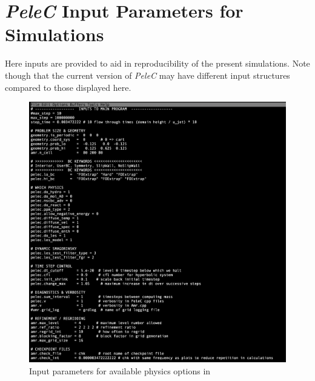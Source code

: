 \chapter{\textit{PeleC} Input Parameters for Simulations} \label{Pelec-Inputs}
Here inputs are provided to aid in reproducibility of the present simulations. Note though that the current version of \textit{PeleC} may have different input structures compared to those displayed here. 
\begin{figure}[H]
\begin{center}
\includegraphics[scale=0.5]{figures/inputs.png}
\end{center}
\caption{Input parameters for available physics options in }
\label{PeleC_input_fig}
\end{figure} 

